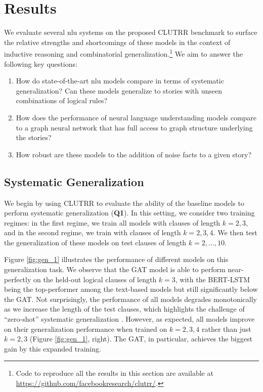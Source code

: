 \documentclass[letterpaper, 12pt]{report}
\begin{document}
\section{Results}
\label{sec:clutrr_results}

We evaluate several \acrshort{nlu} systems on the proposed CLUTRR benchmark to surface the relative strengths and shortcomings of these models in the context of inductive reasoning and combinatorial generalization.\footnote{Code to reproduce all the results in this section are available at  \href{https://github.com/facebookresearch/clutrr/}{https://github.com/facebookresearch/clutrr/}.} We aim to answer the following key questions:
\begin{enumerate}[label=({\bf Q\arabic*}), leftmargin=28pt, topsep=0pt, itemsep=0pt, parsep=0pt]
\item How do state-of-the-art \acrshort{nlu} models compare in terms of systematic generalization? Can these models generalize to stories with unseen combinations of logical rules?
 \item How does the performance of neural language understanding models compare to a graph neural network that has full access to graph structure underlying the stories?
    \item How robust are these models to the addition of noise facts to a given story?
\end{enumerate}

\subsection{Systematic Generalization}
\label{sec:clutrr_sys_gen}

We begin by using CLUTRR to evaluate the ability of the baseline models to perform systematic generalization (\textbf{Q1}).
In this setting, we consider two training regimes: in the first regime, we train all models with clauses of length $k=2,3$, and in the second regime, we train with clauses of length $k=2,3,4$.
We then test the generalization of these models on test clauses of length $k=2,...,10$.

Figure \ref{fig:gen_1} illustrates the performance of different models on this generalization task.
We observe that the GAT model is able to perform near-perfectly on the held-out logical clauses of length $k=3$, with the BERT-LSTM being the top-performer among the text-based models but still significantly below the GAT.
Not surprisingly, the performance of all models degrades monotonically as we increase the length of the test clauses, which highlights the challenge of ``zero-shot'' systematic generalization \cite{Lake2018:SCAN, 2018arXiv181107017S}.
However, as expected, all models improve on their generalization performance when trained on $k=2,3,4$ rather than just $k=2,3$ (Figure \ref{fig:gen_1}, right). The GAT, in particular, achieves the biggest gain by this expanded training.
\end{document}
